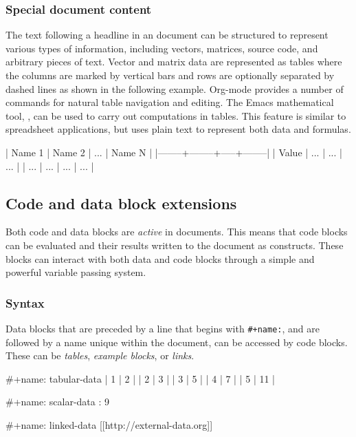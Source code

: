 \documentclass[article,shortnames]{jss}
\begin{document}
\subsubsection{Special document content}
\label{sec-3-1-3}


The text following a headline in an  document can be
structured to represent various types of information, including
vectors, matrices, source code, and arbitrary pieces of text.  Vector
and matrix data are represented as tables where the columns are marked
by vertical bars and rows are optionally separated by dashed lines as
shown in the following example.  Org-mode provides a number of
commands for natural table navigation and editing.  The Emacs
mathematical tool,  \cite{calc}, can be used to carry out
computations in tables.  This feature is similar to spreadsheet
applications, but  uses plain text to represent both data and
formulas.


\begin{Code}
| Name 1 | Name 2 | ... | Name N |
|--------+--------+-----+--------|
| Value  | ...    | ... | ...    |
| ...    | ...    | ... | ...    |
\end{Code}
\subsection{Code and data block extensions}
\label{sec-3-2}
\label{code-blocks}


Both code and data blocks are \emph{active} in  documents.  This
means that code blocks can be evaluated and their results written to
the document as  constructs.  These blocks can interact with
both data and code blocks through a simple and powerful variable
passing system.
\subsubsection{Syntax}
\label{sec-3-2-1}
\label{syntax}


Data blocks that are preceded by a line that begins with \texttt{\#+name:},
and are followed by a name unique within the document, can be accessed
by code blocks. These can be \emph{tables}, \emph{example blocks}, or \emph{links}.

\begin{Code}
#+name: tabular-data
| 1 |  2 |
| 2 |  3 |
| 3 |  5 |
| 4 |  7 |
| 5 | 11 |

#+name: scalar-data
: 9

#+name: linked-data
[[http://external-data.org]]
\end{Code}
\end{document}
